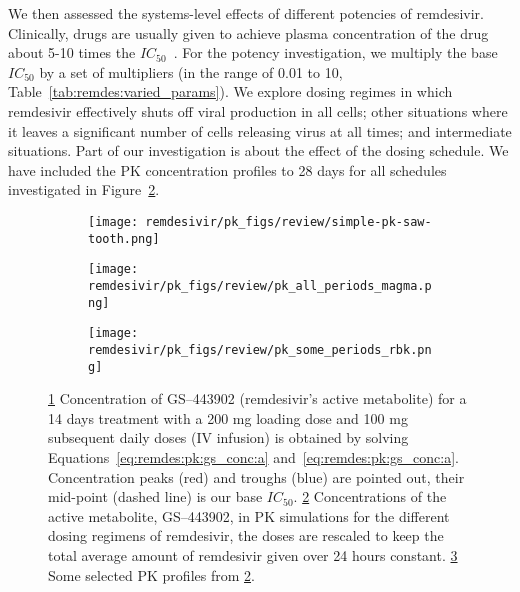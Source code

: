 We then assessed the systems-level effects of different potencies of remdesivir. Clinically, drugs are usually given to achieve plasma concentration of the drug about 5-10 times the $IC_{50}$~\cite{mateus_prediction_2017}. For the potency investigation, we multiply the base $IC_{50}$ by a set of multipliers (in the range of 0.01 to 10, Table~\ref{tab:remdes:varied_params}). We explore dosing regimes in which remdesivir effectively shuts off viral production in all cells; other situations where it leaves a significant number of cells releasing virus at all times; and intermediate situations. Part of our investigation is about the effect of the dosing schedule. We have included the PK concentration profiles to 28 days for all schedules investigated in Figure~\ref{fig:remdes:res:pk:all_profiles}.
\begin{figure}[H]
\centering
\begin{subfigure}[b]{\textwidth}
    \centering
    \texttt{[image: remdesivir/pk\_figs/review/simple-pk-saw-tooth.png]} 
    \caption{} 
    \label{fig:remdes:res:pk:ic50_deter} 
  \end{subfigure}
    \hspace{\fill}
    \vspace{4ex}
  
  \begin{subfigure}[b]{0.48\textwidth}
    \centering
    \texttt{[image: remdesivir/pk\_figs/review/pk\_all\_periods\_magma.png]} 
    \caption{} 
    \label{fig:remdes:res:pk:all_profiles} 
  \end{subfigure} 
  \hspace{\fill}  %
  \begin{subfigure}[b]{0.48\textwidth}
    \centering
    \texttt{[image: remdesivir/pk\_figs/review/pk\_some\_periods\_rbk.png]} 
    \caption{} 
    \label{fig:remdes:res:pk:some_profiles} 
  \end{subfigure} 
\caption{\ref{fig:remdes:res:pk:ic50_deter} Concentration of GS--443902 (remdesivir’s active metabolite) for a 14 days treatment with a 200 mg loading dose and 100 mg subsequent daily doses (IV infusion) is obtained by solving Equations~\ref{eq:remdes:pk:gs_conc:a} and~\ref{eq:remdes:pk:gs_conc:a}. Concentration peaks (red) and troughs (blue) are pointed out, their mid-point (dashed line) is our base $IC_{50}$. \ref{fig:remdes:res:pk:all_profiles} Concentrations of the active metabolite, GS--443902, in PK simulations for the different dosing regimens of remdesivir, the doses are rescaled to keep the total average amount of remdesivir given over 24 hours constant. \ref{fig:remdes:res:pk:some_profiles} Some selected PK profiles from \ref{fig:remdes:res:pk:all_profiles}.}\label{fig:remdes:res:pk}
\end{figure}




